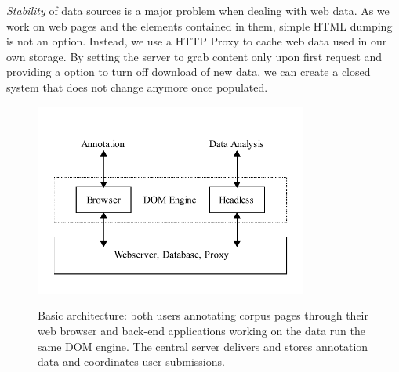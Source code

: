 \textit{Stability} of data sources is a major problem when dealing with web data.
As we work on web pages and the elements contained in them, simple HTML dumping is not an option.
Instead, we use a HTTP Proxy to cache web data used in our own storage.
By setting the server to grab content only upon first request and providing a option to turn off download of new data, we can create a closed system that does not change anymore once populated.


\begin{figure}
	{\includegraphics[width=0.8\textwidth]{arch}}
\caption{\label{f:arch}Basic {\KrdWrd} architecture: both users annotating corpus pages through their web browser
and back-end applications working on the data run the same DOM engine.
	The central server delivers and stores annotation data and coordinates user submissions.}
\end{figure}


